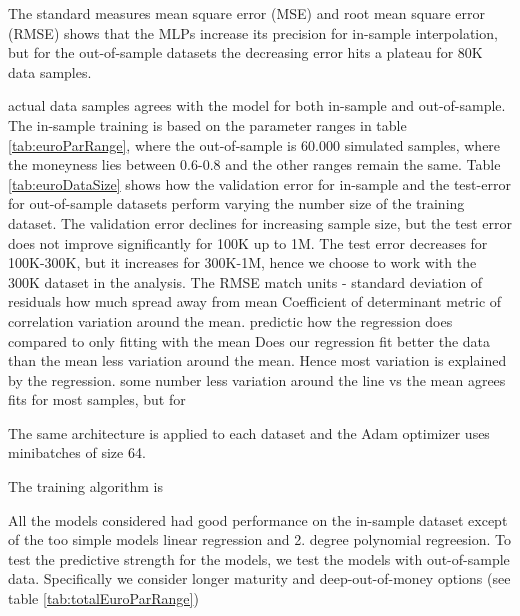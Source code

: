The standard measures mean square error (MSE) and root mean square error (RMSE) shows that the MLPs increase its precision for in-sample interpolation, but for the out-of-sample datasets the decreasing error hits a plateau for 80K data samples.  




actual data samples agrees with the model for both in-sample and out-of-sample. The in-sample training is based on the parameter ranges in table \ref{tab:euroParRange}, where the out-of-sample is 60.000 simulated samples, where the moneyness lies between 0.6-0.8 and the other ranges remain the same.  Table \ref{tab:euroDataSize} shows how the validation error for in-sample and the test-error for out-of-sample datasets perform varying the number size of the training dataset. The validation error declines for increasing sample size, but the test error does not improve significantly for 100K up to 1M. The test error decreases for 100K-300K, but it increases for 300K-1M, hence we choose to work with the 300K dataset in the analysis. The 
RMSE match units - standard deviation of residuals how much spread away from mean
Coefficient of determinant metric of correlation
variation around the mean.
predictic how the regression does compared to only fitting with the mean
Does our regression fit better the data than the mean
less variation around the mean. Hence most variation is explained by the regression. some number less variation around the line vs the mean
agrees fits for most samples, but for 



The same architecture is applied to each dataset and the Adam optimizer uses minibatches of size 64.

The training algorithm is 


All the models considered had good performance on the in-sample dataset except of the too simple models linear regression and 2. degree polynomial regreesion. To test the predictive strength for the models, we test the models with out-of-sample data. Specifically we consider longer maturity and deep-out-of-money options (see table \ref{tab:totalEuroParRange})

